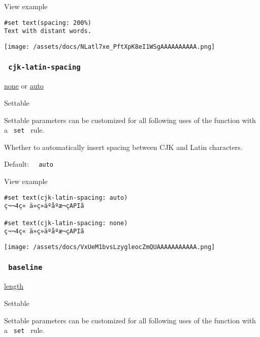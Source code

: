 
View example

\begin{verbatim}
#set text(spacing: 200%)
Text with distant words.
\end{verbatim}

\texttt{[image: /assets/docs/NLatl7xe\_PftXpK8eI1WSgAAAAAAAAAA.png]}

\subsubsection{\texorpdfstring{\texttt{\ cjk-latin-spacing\ }}{ cjk-latin-spacing }}\label{parameters-cjk-latin-spacing}

\href{/docs/reference/foundations/none/}{none} {or}
\href{/docs/reference/foundations/auto/}{auto}

{{ Settable }}

\label{parameters-cjk-latin-spacing-settable-tooltip}
Settable parameters can be customized for all following uses of the
function with a \texttt{\ set\ } rule.

Whether to automatically insert spacing between CJK and Latin
characters.

Default: \texttt{\ }{\texttt{\ auto\ }}\texttt{\ }


View example

\begin{verbatim}
#set text(cjk-latin-spacing: auto)
ç¬¬4ç« ä»ç»äºåºæ¬çAPIã

#set text(cjk-latin-spacing: none)
ç¬¬4ç« ä»ç»äºåºæ¬çAPIã
\end{verbatim}

\texttt{[image: /assets/docs/VxUeM1bvsLzygleocZmQUAAAAAAAAAAA.png]}

\subsubsection{\texorpdfstring{\texttt{\ baseline\ }}{ baseline }}\label{parameters-baseline}

\href{/docs/reference/layout/length/}{length}

{{ Settable }}

\label{parameters-baseline-settable-tooltip}
Settable parameters can be customized for all following uses of the
function with a \texttt{\ set\ } rule.

